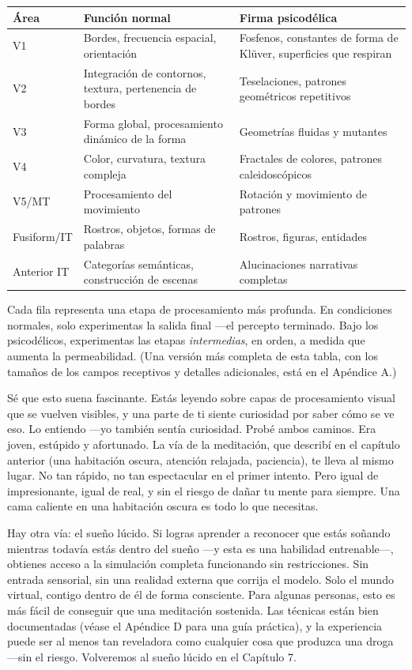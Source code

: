 \documentclass[11pt, twoside, openright]{book}
\begin{document}
\small
\begin{xltabular}{\linewidth}{X X X}
\toprule
\textbf{Área} & \textbf{Función normal} & \textbf{Firma psicodélica} \\
\midrule\endhead
V1 & Bordes, frecuencia espacial, orientación & Fosfenos, constantes de forma de Klüver, superficies que respiran \\[4pt]
V2 & Integración de contornos, textura, pertenencia de bordes & Teselaciones, patrones geométricos repetitivos \\[4pt]
V3 & Forma global, procesamiento dinámico de la forma & Geometrías fluidas y mutantes \\[4pt]
V4 & Color, curvatura, textura compleja & Fractales de colores, patrones caleidoscópicos \\[4pt]
V5/\allowbreak{}MT & Procesamiento del movimiento & Rotación y movimiento de patrones \\[4pt]
Fusiform/\allowbreak{}IT & Rostros, objetos, formas de palabras & Rostros, figuras, entidades \\[4pt]
Anterior IT & Categorías semánticas, construcción de escenas & Alucinaciones narrativas completas \\[4pt]
\bottomrule
\end{xltabular}
\normalsize


Cada fila representa una etapa de procesamiento más profunda. En condiciones normales, solo experimentas la salida final ---el percepto terminado. Bajo los psicodélicos, experimentas las etapas \textit{intermedias}, en orden, a medida que aumenta la permeabilidad. (Una versión más completa de esta tabla, con los tamaños de los campos receptivos y detalles adicionales, está en el Apéndice A.)

Sé que esto suena fascinante. Estás leyendo sobre capas de procesamiento visual que se vuelven visibles, y una parte de ti siente curiosidad por saber cómo se ve eso. Lo entiendo ---yo también sentía curiosidad. Probé ambos caminos. Era joven, estúpido y afortunado. La vía de la meditación, que describí en el capítulo anterior (una habitación oscura, atención relajada, paciencia), te lleva al mismo lugar. No tan rápido, no tan espectacular en el primer intento. Pero igual de impresionante, igual de real, y sin el riesgo de dañar tu mente para siempre. Una cama caliente en una habitación oscura es todo lo que necesitas.

Hay otra vía: el sueño lúcido. Si logras aprender a reconocer que estás soñando mientras todavía estás dentro del sueño ---y esta es una habilidad entrenable---, obtienes acceso a la simulación completa funcionando sin restricciones. Sin entrada sensorial, sin una realidad externa que corrija el modelo. Solo el mundo virtual, contigo dentro de él de forma consciente. Para algunas personas, esto es más fácil de conseguir que una meditación sostenida. Las técnicas están bien documentadas (véase el Apéndice D para una guía práctica), y la experiencia puede ser al menos tan reveladora como cualquier cosa que produzca una droga ---sin el riesgo. Volveremos al sueño lúcido en el Capítulo 7.
\end{document}
